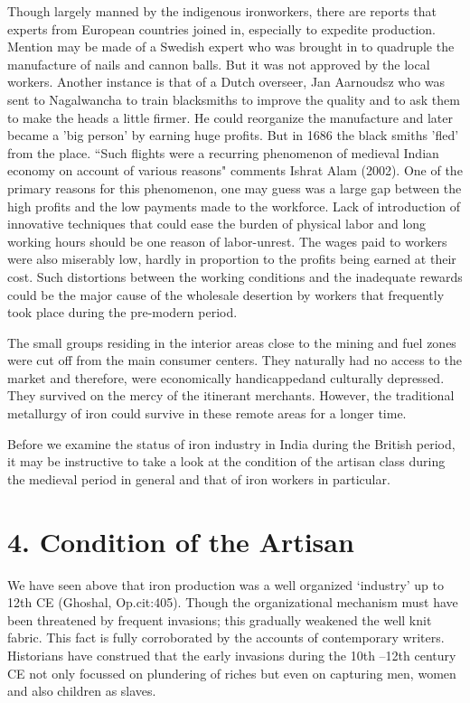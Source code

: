 Though largely manned by the indigenous ironworkers, there are reports that experts from European countries joined in, especially to expedite production. Mention may be made of a Swedish expert who was brought in to quadruple the manufacture of nails and cannon balls. But it was not approved by the local workers. Another instance is that of a Dutch overseer, Jan Aarnoudsz who was sent to Nagalwancha to train blacksmiths to improve the quality and to ask them to make the heads a little firmer. He could reorganize the manufacture and later became a 'big person' by earning huge profits. But in 1686 the black smiths 'fled' from the place. ``Such flights were a recurring phenomenon of medieval Indian economy on account of various reasons" comments Ishrat Alam (2002). One of the primary reasons for this phenomenon, one may guess was a large gap between the high profits and the low payments made to the workforce. Lack of introduction of innovative techniques that could ease the burden of physical labor and long working hours should be one reason of labor-unrest. The wages paid to workers were also miserably low, hardly in proportion to the profits being earned at their cost. Such distortions between the working conditions and the inadequate rewards could be the major cause of the wholesale desertion by workers that frequently took place during the pre-modern period.

The small groups residing in the interior areas close to the mining and fuel zones were cut off from the main consumer centers. They naturally had no access to the market and therefore, were economically handicappedand culturally depressed. They survived on the mercy of the itinerant merchants. However, the traditional metallurgy of iron could survive in these remote areas for a longer time.

Before we examine the status of iron industry in India during the British period, it may be instructive to take a look at the condition of the artisan class during the medieval period in general and that of iron workers in particular.


\section*{4. Condition of the Artisan}

We have seen above that iron production was a well organized `industry' up to 12th CE (Ghoshal, Op.cit:405). Though the organizational mechanism must have been threatened by frequent invasions; this gradually weakened the well knit fabric. This fact is fully corroborated by the accounts of contemporary writers. Historians have construed that the early invasions during the 10th –12th century CE not only focussed on plundering of riches but even on capturing men, women and also children as slaves.

